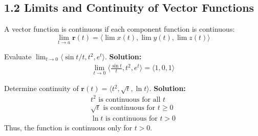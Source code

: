 \subsection*{1.2 Limits and Continuity of Vector Functions}

\begin{conceptbox}
    A vector function is continuous if each component function is continuous:
    \begin{equation*}
        \lim_{t \to a} \mathbf{r}(t) = \langle \lim x(t), \lim y(t), \lim z(t) \rangle
    \end{equation*}
\end{conceptbox}

\begin{examplebox}
    Evaluate $\lim_{t\to 0} \langle \sin t/t, t^2, e^t \rangle$.
    \newline \textbf{Solution:}
    \begin{align*}
        \lim_{t\to 0} \langle \frac{\sin t}{t}, t^2, e^t \rangle
        = \langle 1, 0, 1 \rangle
    \end{align*}
\end{examplebox}

\begin{examplebox}
    Determine continuity of $\mathbf{r}(t)=\langle t^2, \sqrt{t}, \ln t \rangle$.
    \newline \textbf{Solution:}
    \begin{align*}
        t^2 \text{ is continuous for all } t        \\
        \sqrt{t} \text{ is continuous for } t \ge 0 \\
        \ln t \text{ is continuous for } t>0
    \end{align*}
    Thus, the function is continuous only for $t>0$.
\end{examplebox}